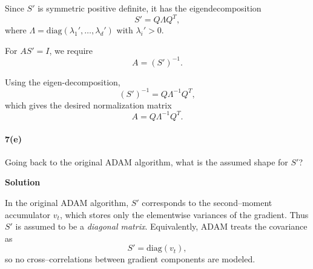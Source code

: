 \documentclass[11pt]{article}
\begin{document}
	Since $S'$ is symmetric positive definite, it has the eigendecomposition
	\[
	S' = Q \Lambda Q^T,
	\]
	where $\Lambda = \mathrm{diag}(\lambda_1',\ldots,\lambda_d')$ with
	$\lambda_i' > 0$.
	
	For $A S' = I$, we require
	\[
	A = (S')^{-1}.
	\]
	
	Using the eigen-decomposition,
	\[
	(S')^{-1}
	= Q \Lambda^{-1} Q^T,
	\]
	which gives the desired normalization matrix
	\[
	A = Q \Lambda^{-1} Q^T.
	\]
	
	\paragraph{7(e)} Going back to the original ADAM algorithm, what is the assumed shape for $S'$?
	
	\noindent\textbf{Solution}
	
	In the original ADAM algorithm, $S'$ corresponds to the second--moment
	accumulator $v_t$, which stores only the elementwise variances of the gradient.
	Thus $S'$ is assumed to be a \emph{diagonal matrix}.  
	Equivalently, ADAM treats the covariance as
	\[
	S' = \mathrm{diag}(v_t),
	\]
	so no cross–correlations between gradient components are modeled.
	
\end{document}
